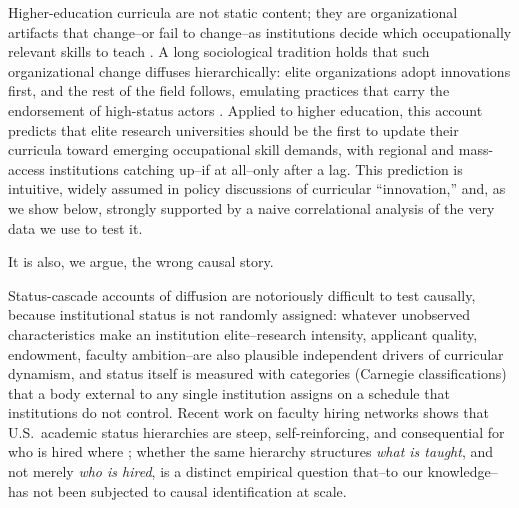 \documentclass[11pt, letterpaper]{article}
\newcommand{\parencite}[1]{\cite{#1}}
\begin{document}
Higher-education curricula are not static content; they are organizational artifacts that change--or fail to change--as institutions decide which occupationally relevant skills to teach \parencite{autorskill2003, javadiansabet2024}. A long sociological tradition holds that such organizational change diffuses hierarchically: elite organizations adopt innovations first, and the rest of the field follows, emulating practices that carry the endorsement of high-status actors \parencite{podolny1993, phillipszuckerman2001, strangsoule1998, dimaggiopowell1983}. Applied to higher education, this account predicts that elite research universities should be the first to update their curricula toward emerging occupational skill demands, with regional and mass-access institutions catching up--if at all--only after a lag. This prediction is intuitive, widely assumed in policy discussions of curricular ``innovation,'' and, as we show below, strongly supported by a naive correlational analysis of the very data we use to test it.

It is also, we argue, the wrong causal story.

Status-cascade accounts of diffusion are notoriously difficult to test causally, because institutional status is not randomly assigned: whatever unobserved characteristics make an institution elite--research intensity, applicant quality, endowment, faculty ambition--are also plausible independent drivers of curricular dynamism, and status itself is measured with categories (Carnegie classifications) that a body external to any single institution assigns on a schedule that institutions do not control. Recent work on faculty hiring networks shows that U.S.\ academic status hierarchies are steep, self-reinforcing, and consequential for who is hired where \parencite{clauset2015}; whether the same hierarchy structures \emph{what is taught}, and not merely \emph{who is hired}, is a distinct empirical question that--to our knowledge--has not been subjected to causal identification at scale.
\end{document}
